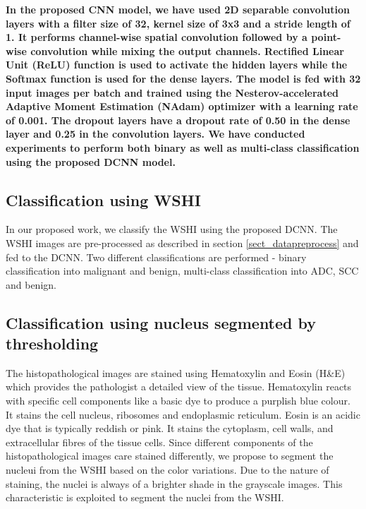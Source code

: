 \documentclass{comjnl}
\begin{document}
\textbf{
In the proposed CNN model, we have used 2D separable convolution layers with a filter size of 32, kernel size of 3x3 and a stride length of 1. It performs channel-wise spatial convolution followed by a point- wise convolution while mixing the output channels. Rectified Linear Unit (ReLU) function is used to activate the hidden layers while the Softmax function is used for the dense layers. The model is fed with 32 input images per batch and trained using the Nesterov-accelerated Adaptive Moment Estimation (NAdam) optimizer with a learning rate of 0.001. The dropout layers have a dropout rate of 0.50 in the dense layer and 0.25 in the convolution layers. We have conducted experiments to perform both binary as well as multi-class classification using the proposed DCNN model.
}

\subsection{Classification using WSHI}

In our proposed work, we classify the WSHI using the proposed DCNN. The WSHI images are pre-processed as described in section \ref{sect_datapreprocess} and fed to the DCNN. Two different classifications are performed - binary classification into malignant and benign, multi-class classification into ADC, SCC and benign.  

\subsection{Classification using nucleus segmented by thresholding}

 The histopathological images are stained using Hematoxylin and Eosin (H\&E) which provides the pathologist a detailed view of the tissue. Hematoxylin reacts with specific cell components like a basic dye to produce a purplish blue colour. It stains the cell nucleus, ribosomes and endoplasmic reticulum. Eosin is an acidic dye that is typically reddish or pink. It stains the cytoplasm, cell walls, and extracellular fibres of the tissue cells. Since different components of the histopathological images care stained differently, we propose  to  segment the nucleui from the WSHI based on the color variations. Due to the nature of staining, the nuclei is always of a brighter shade in the grayscale images. This characteristic is exploited to segment the nuclei from the WSHI. 
 
\end{document}
